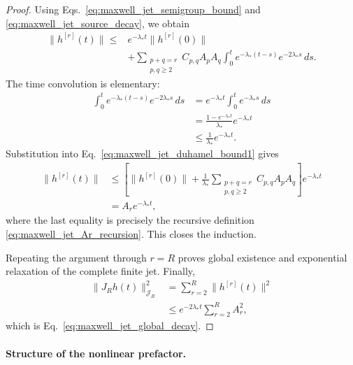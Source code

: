 \documentclass[11pt,oneside]{article}
\numberwithin{equation}{section}
\theoremstyle{definition}
\begin{document}
\begin{proof}
Using Eqs.~\eqref{eq:maxwell_jet_semigroup_bound} and
\eqref{eq:maxwell_jet_source_decay}, we obtain
\begin{align}
\|h^{[r]}(t)\|
\leq{}&
e^{-\lambda_*t}
\|h^{[r]}(0)\|
\nonumber\\
&+
\sum_{\substack{p+q=r\\p,q\geq2}}
C_{p,q}A_pA_q
\int_0^t
e^{-\lambda_*(t-s)}
e^{-2\lambda_*s}
\,ds .
\label{eq:maxwell_jet_duhamel_bound1}
\end{align}
The time convolution is elementary:
\begin{align}
\int_0^t
e^{-\lambda_*(t-s)}
e^{-2\lambda_*s}
\,ds
&=
e^{-\lambda_*t}
\int_0^t
e^{-\lambda_*s}\,ds
\nonumber\\
&=
\frac{
1-e^{-\lambda_*t}
}{
\lambda_*
}
e^{-\lambda_*t}
\nonumber\\
&\leq
\frac{1}{\lambda_*}
e^{-\lambda_*t}.
\label{eq:maxwell_jet_convolution_bound}
\end{align}
Substitution into
Eq.~\eqref{eq:maxwell_jet_duhamel_bound1} gives
\begin{align}
\|h^{[r]}(t)\|
&\leq
\left[
\|h^{[r]}(0)\|
+
\frac{1}{\lambda_*}
\sum_{\substack{p+q=r\\p,q\geq2}}
C_{p,q}A_pA_q
\right]
e^{-\lambda_*t}
\nonumber\\
&=
A_re^{-\lambda_*t},
\end{align}
where the last equality is precisely the recursive definition
\eqref{eq:maxwell_jet_Ar_recursion}.  This closes the induction.

Repeating the argument through $r=R$ proves global existence and
exponential relaxation of the complete finite jet.  Finally,
\begin{align}
\|J_Rh(t)\|_{\mathscr J_R}^2
&=
\sum_{r=2}^{R}
\|h^{[r]}(t)\|^2
\nonumber\\
&\leq
e^{-2\lambda_*t}
\sum_{r=2}^{R}A_r^2,
\end{align}
which is Eq.~\eqref{eq:maxwell_jet_global_decay}.
\end{proof}

\paragraph{Structure of the nonlinear prefactor.}
\end{document}
